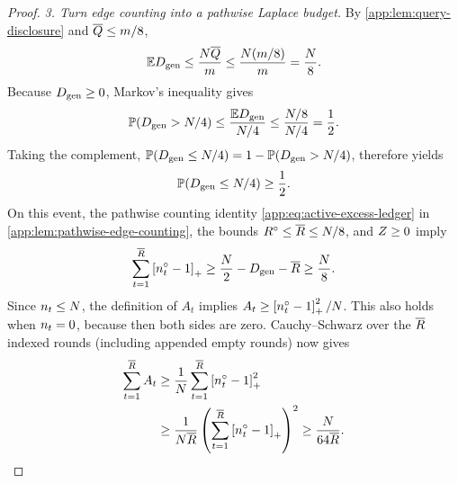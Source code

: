 \begin{proof}
\emph{3. Turn edge counting into a pathwise Laplace budget.}
By \cref{app:lem:query-disclosure} and
\(\overline Q{}\le m/8\),
\[
 \mathbb ED_{\mathrm{gen}}
 \le\frac{N\overline Q{}}{m}
 \le\frac{N(m/8)}{m}
 =\frac N8.
\]
Because \(D_{\mathrm{gen}}\ge0\), Markov's inequality gives
\[
 \mathbb P(D_{\mathrm{gen}}>N/4)
 \le\frac{\mathbb ED_{\mathrm{gen}}}{N/4}
 \le\frac{N/8}{N/4}=\frac12.
\]
Taking the complement,
\(\mathbb P(D_{\mathrm{gen}}\le N/4)=1-\mathbb P(D_{\mathrm{gen}}>N/4)\),
therefore yields
\begin{equation}
 \mathbb P(D_{\mathrm{gen}}\le N/4)\ge\frac12.
 \label{app:eq:few-genie-deletions-event}
\end{equation}
On this event, the pathwise counting identity
\eqref{app:eq:active-excess-ledger} in \cref{app:lem:pathwise-edge-counting}, the bounds
\(R^{\circ}\le \overline R{}\le N/8\), and
\(Z\ge0\) imply
\begin{equation}
 \sum_{t=1}^{\overline R{}}\left[n_{t}^{\circ}-1\right]_+
 \ge \frac N2-D_{\mathrm{gen}}-\overline R{}
 \ge\frac N8.
 \label{app:eq:pathwise-active-excess}
\end{equation}
Since \(n_{t}\le N\), the definition of \(A_t\)
implies \(A_t\ge\left[n_{t}^{\circ}-1\right]_+^2/N\).
This also holds when \(n_{t}=0\), because then both
sides are zero. Cauchy--Schwarz over the \(\overline R{}\) indexed rounds
(including appended empty rounds) now gives
\begin{align}
 \sum_{t=1}^{\overline R{}}A_t
 &\ge\frac1N\sum_{t=1}^{\overline R{}}\left[n_{t}^{\circ}-1\right]_+^2\notag\\
 &\ge\frac1{N\overline R{}}
       \left(\sum_{t=1}^{\overline R{}}\left[n_{t}^{\circ}-1\right]_+\right)^2
 \ge\frac{N}{64\overline R{}}.
 \label{app:eq:pathwise-laplace-budget}
\end{align}



\end{proof}
